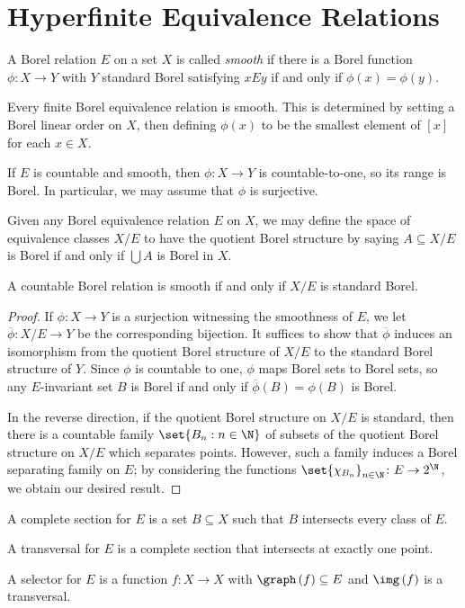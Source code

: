 \documentclass[10pt]{mypackage}
\begin{document}
\section{Hyperfinite Equivalence Relations}%
\begin{definition}
  A Borel relation $E$ on a set $X$ is called \textit{smooth} if there is a Borel function $\phi\colon X\rightarrow Y$ with $Y$ standard Borel satisfying $xEy$ if and only if $\phi(x) = \phi(y)$.
\end{definition}
\begin{example}
  Every finite Borel equivalence relation is smooth. This is determined by setting a Borel linear order on $X$, then defining $\phi(x)$ to be the smallest element of $[x]$ for each $x\in X$.
\end{example}
\begin{remark}
  If $E$ is countable and smooth, then $\phi\colon X\to Y$ is countable-to-one, so its range is Borel. In particular, we may assume that $\phi$ is surjective.
\end{remark}
Given any Borel equivalence relation $E$ on $X$, we may define the space of equivalence classes $X/E$ to have the quotient Borel structure by saying $A\subseteq X/E$ is Borel if and only if $\bigcup A$ is Borel in $X$.
\begin{proposition}
  A countable Borel relation is smooth if and only if $X/E$ is standard Borel.
\end{proposition}
\begin{proof}
  If $\phi\colon X\to Y$ is a surjection witnessing the smoothness of $E$, we let $ \overline{\phi}\colon X/E\rightarrow Y $ be the corresponding bijection. It suffices to show that $ \overline{\phi} $ induces an isomorphism from the quotient Borel structure of $X/E$ to the standard Borel structure of $Y$. Since $\phi$ is countable to one, $\phi$ maps Borel sets to Borel sets, so any $E$-invariant set $B$ is Borel if and only if $ \overline{\phi}(B) = \phi(B) $ is Borel.

  In the reverse direction, if the quotient Borel structure on $X/E$ is standard, then there is a countable family $\set{B_n:n\in \N}$ of subsets of the quotient Borel structure on $X/E$ which separates points. However, such a family induces a Borel separating family on $E$; by considering the functions $\set{\chi_{B_n}}_{n\in \N}\colon E\rightarrow 2^{\N}$, we obtain our desired result.
\end{proof}
\begin{definition}
  A complete section for $E$ is a set $B\subseteq X$ such that $B$ intersects every class of $E$.

  A transversal for $E$ is a complete section that intersects at exactly one point.

  A selector for $E$ is a function $f\colon X\rightarrow X$ with $\graph\left( f \right) \subseteq E$ and $\img\left( f \right)$ is a transversal.
\end{definition}
\end{document}
